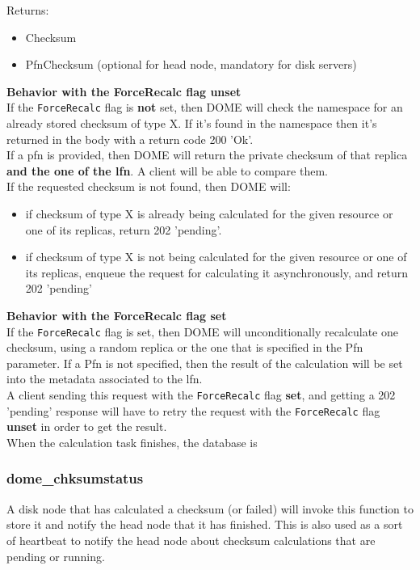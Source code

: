 \documentclass[a4paper,10pt]{scrreprt}
\begin{document}
Returns:
\begin{itemize}
 \item Checksum
 \item PfnChecksum (optional for head node, mandatory for disk servers)
\end{itemize}

\textbf{Behavior with the ForceRecalc flag unset}\\

If the \lstinline"ForceRecalc" flag is \textbf{not} set, then DOME will check
the namespace for an already stored checksum of type X. If it's found in the namespace then it's returned in the body with a return code 200 'Ok'.\\

If a pfn is provided, then DOME will return the private checksum of that replica \textbf{and the one of the lfn}. A client will be able to compare them.\\
 
If the requested checksum is not found, then DOME will:\\
\begin{itemize}
 \item if checksum of type X is already being calculated for the given resource or one of its replicas, return 202 'pending'. 
 \item if checksum of type X is not being calculated for the given resource or one of its replicas, enqueue the request for calculating it asynchronously, and return 202 'pending'
\end{itemize}
 
 
\textbf{Behavior with the ForceRecalc flag set}\\

If the \lstinline"ForceRecalc" flag is set, then DOME will unconditionally recalculate one checksum, using a random replica or the one that is specified in the Pfn parameter.
If a Pfn is not specified, then the result of the calculation will be set into the metadata associated to the lfn.\\
A client sending this request with the  \lstinline"ForceRecalc" flag \textbf{set}, and getting a 202 'pending' response will have to retry the request with the \lstinline"ForceRecalc" flag \textbf{unset} in order to get the result.\\
When the calculation task finishes, the database is 

\subsubsection{dome\_chksumstatus}
A disk node that has calculated a checksum (or failed) will invoke this function to store it and notify the head node that it has finished.
This is also used as a sort of heartbeat to notify the head node about checksum calculations that are pending or running.
\end{document}
